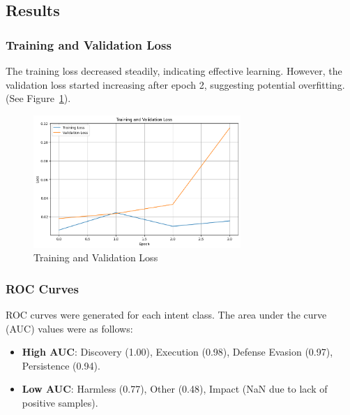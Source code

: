     \subsection{Results}

        \subsubsection{Training and Validation Loss \\}

            The training loss decreased steadily, indicating effective learning. However, the validation loss started increasing after epoch 2, suggesting potential overfitting. (See Figure~\ref{fig:loss}).

            \begin{figure}[h]
                \centering
                \includegraphics[width=0.7\textwidth]{../figures/plots/section4/Training_Validation_loss.png}
                \caption{Training and Validation Loss}
                \label{fig:loss}
            \end{figure}

        \subsubsection{ROC Curves \\}

            ROC curves were generated for each intent class. The area under the curve (AUC) values were as follows:
            
            \begin{itemize}
            
                \item \textbf{High AUC}: Discovery (1.00), Execution (0.98), Defense Evasion (0.97), Persistence (0.94).
                
                \item \textbf{Low AUC}: Harmless (0.77), Other (0.48), Impact (NaN due to lack of positive samples).
                
            \end{itemize}
            
